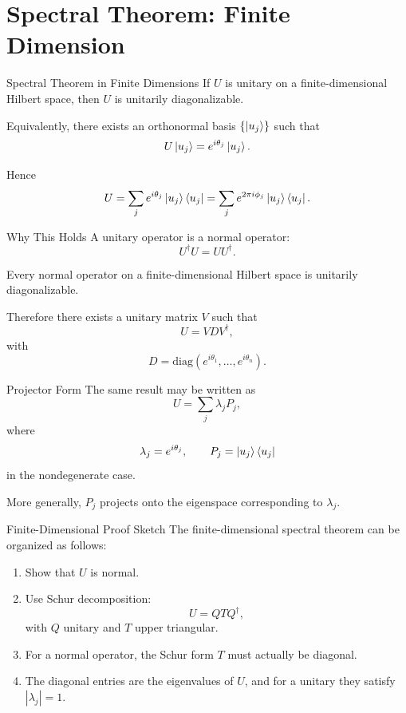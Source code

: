 \documentclass{beamer}
\begin{document}
\section{Spectral Theorem: Finite Dimension}

\begin{frame}{Spectral Theorem in Finite Dimensions}
If \(U\) is unitary on a finite-dimensional Hilbert space, then \(U\) is unitarily diagonalizable.

\medskip

Equivalently, there exists an orthonormal basis \(\{\ket{u_j}\}\) such that
\[
U\ket{u_j}=e^{i\theta_j}\ket{u_j}.
\]

Hence
\[
U=\sum_j e^{i\theta_j}\ket{u_j}\bra{u_j}
=\sum_j e^{2\pi i\phi_j}\ket{u_j}\bra{u_j}.
\]
\end{frame}

\begin{frame}{Why This Holds}
A unitary operator is a normal operator:
\[
U^\dagger U = UU^\dagger.
\]

Every normal operator on a finite-dimensional Hilbert space is unitarily diagonalizable.

Therefore there exists a unitary matrix \(V\) such that
\[
U=VDV^\dagger,
\]
with
\[
D=\mathrm{diag}(e^{i\theta_1},\dots,e^{i\theta_n}).
\]
\end{frame}

\begin{frame}{Projector Form}
The same result may be written as
\[
U=\sum_j \lambda_j P_j,
\]
where
\[
\lambda_j=e^{i\theta_j},
\qquad
P_j=\ket{u_j}\bra{u_j}
\]
in the nondegenerate case.

\medskip

More generally, \(P_j\) projects onto the eigenspace corresponding to \(\lambda_j\).
\end{frame}

\begin{frame}{Finite-Dimensional Proof Sketch}
The finite-dimensional spectral theorem can be organized as follows:
\begin{enumerate}
\item Show that \(U\) is normal.
\item Use Schur decomposition:
\[
U=QTQ^\dagger,
\]
with \(Q\) unitary and \(T\) upper triangular.
\item For a normal operator, the Schur form \(T\) must actually be diagonal.
\item The diagonal entries are the eigenvalues of \(U\), and for a unitary they satisfy \(|\lambda_j|=1\).
\end{enumerate}
\end{frame}
\end{document}
